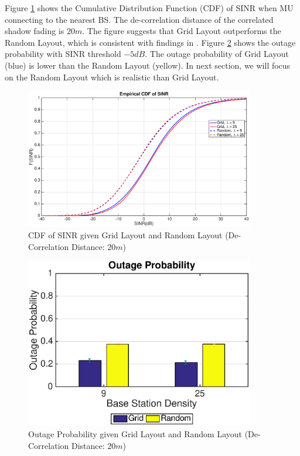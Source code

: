 \par Figure \ref{cdf1} shows the Cumulative Distribution Function (CDF) of SINR when MU connecting to the nearest BS. The de-correlation distance of the correlated shadow fading is $20m$. The figure suggests that Grid Layout outperforms the Random Layout, which is consistent with findings in \cite{andrews2011tractable}. Figure \ref{outage1} shows the outage probability with SINR threshold $-5dB$. The outage probability of Grid Layout (blue) is lower than the Random Layout (yellow). In next section, we will focus on the Random Layout which is realistic than Grid Layout.
\begin{figure}
\centering
\includegraphics[width=10cm]{GridVSRandom.eps}
\caption{CDF of SINR given Grid Layout and Random Layout (De-Correlation Distance: $20m$)}
\label{cdf1}
\end{figure}
\begin{figure}
\centering
\includegraphics[width=10cm]{OutageProbGridVSRandom.eps}
\caption{Outage Probability given Grid Layout and Random Layout (De-Correlation Distance: $20m$)}
\label{outage1}
\end{figure}


